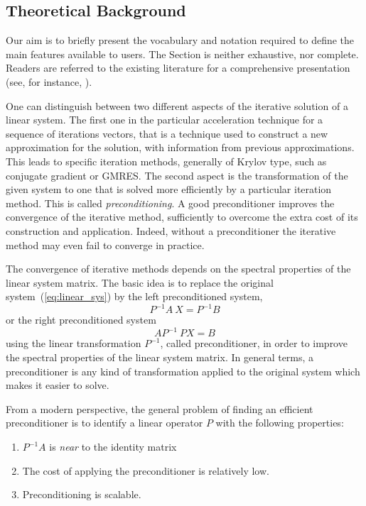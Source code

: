 
\subsection{Theoretical Background}
\label{aztecoo:theoretical}

Our aim is to briefly present the vocabulary and notation 
required to define the main features available to users.
The Section is neither exhaustive, nor complete. Readers are
referred to the existing literature for a comprehensive presentation (see,
for instance, \cite{temp94,axelsson94iterative,saad96iterative}).

\medskip

One can distinguish between two different aspects of the iterative
solution of a linear system. The first one in the particular
acceleration technique for a sequence of iterations vectors, that is a
technique used to construct a new approximation for the solution, with
information from previous approximations.  This leads to specific
iteration methods, generally of Krylov type, such as conjugate gradient
or GMRES. The second aspect is the transformation of the given system to
one that is solved more efficiently by a particular iteration
method. This is called {\em preconditioning}.  A good preconditioner
improves the convergence of the iterative method, sufficiently to
overcome the extra cost of its construction and application. Indeed,
without a preconditioner the iterative method may even fail to converge
in practice.

The convergence of iterative methods depends on the spectral properties
of the linear system matrix. The basic idea is to replace the original
system~(\ref{eq:linear_sys}) by
the left preconditioned system,
\[
P^{-1} A ~ X = P^{-1} B
\]
or the right preconditioned system
\[
A P^{-1} ~ P X = B
\]
using the linear transformation $P^{-1}$,
called preconditioner, in order to improve the spectral properties of
the linear system matrix. In general terms, a preconditioner is any
kind of transformation applied to the original system which makes it
easier to solve.

From a modern perspective, the general problem of finding an efficient
preconditioner is to identify a linear operator $P$ with the following
properties:
\begin{enumerate}
\item $P^{-1} A$ is {\em near} to the identity matrix 
\item The cost of applying the preconditioner is relatively low.
\item Preconditioning is scalable.
\end{enumerate}

